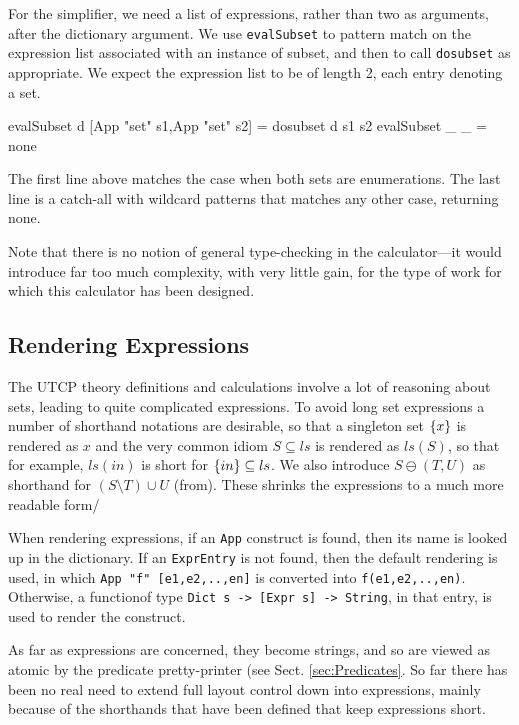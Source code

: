For the simplifier, we need a list of expressions,
rather than two as arguments, after the dictionary argument.
We use \texttt{evalSubset} to pattern match on the expression list
associated with an instance of subset,
and then to call \texttt{dosubset} as appropriate.
We expect the expression list to be of length 2,
each entry denoting a set.
\begin{code}
evalSubset d [App "set" s1,App "set" s2] = dosubset d s1 s2
evalSubset _ _ = none
\end{code}
The first line above matches the case when both sets are enumerations.
The last line is a catch-all with wildcard patterns that matches
any other case, returning none.

Note that there is no notion of general type-checking
in the calculator---it would introduce far too much complexity,
with very little gain,
for the type of work for which this calculator has been designed.

\subsection{Rendering Expressions}

The UTCP theory definitions and calculations
involve a lot of reasoning about sets,
leading to quite complicated expressions.
To avoid long set expressions a number of shorthand notations are desirable,
so that a singleton set $\{{x}\}$ is rendered as $x$
and the very common idiom $S \subseteq ls$
is rendered as $ls(S)$,
so that for example, $ls(in)$ is short for $\{{in}\} \subseteq ls$.
We also introduce $S \ominus (T,U)$ as shorthand for $(S \setminus T) \cup U$
(from\cite{DBLP:conf/icfem/WoodcockH02}).
These shrinks the expressions to a much more readable form/


When rendering expressions,
if an \texttt{App} construct is found, then its name
is looked up in the dictionary.
If an \texttt{ExprEntry} is not found, then the default rendering is used,
in which \verb$App "f" [e1,e2,..,en]$
is converted into \verb$f(e1,e2,..,en)$.
Otherwise, a functionof type \verb$Dict s -> [Expr s] -> String$,
in that entry, is used to render the construct.

As far as expressions are concerned,
they become strings, and so are viewed as atomic
by the predicate pretty-printer (see Sect. \ref{sec:Predicates}.
So far there has been no real need to extend full layout control
down into expressions,
mainly because of the shorthands that have been defined
that keep expressions short.

